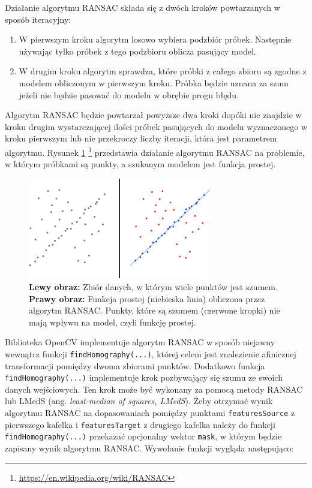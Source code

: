 Działanie algorytmu RANSAC składa się z dwóch kroków powtarzanych w sposób iteracyjny:

\begin{enumerate}
\item W pierwszym kroku algorytm losowo wybiera podzbiór próbek. Następnie używając tylko próbek z tego podzbioru oblicza pasujący model.
\item W drugim kroku algorytm sprawdza, które próbki z całego zbioru są zgodne z modelem obliczonym w pierwszym kroku. Próbka będzie uznana za szum jeżeli nie będzie pasować do modelu w obrębie progu błędu.
\end{enumerate}

Algorytm RANSAC będzie powtarzał powyższe dwa kroki dopóki nie znajdzie w kroku drugim wystarczającej ilości próbek pasujących do modelu wyznaczonego w kroku pierwszym lub nie przekroczy liczby iteracji, która jest parametrem algorytmu. Rysunek \ref{fig:proponowane_algorytmy:ransac} \footnote{\url{https://en.wikipedia.org/wiki/RANSAC}} przedstawia działanie algorytmu RANSAC na problemie, w którym próbkami są punkty, a szukanym modelem jest funkcja prostej.

\begin{figure}[htb]
  \centering
  \includegraphics[width=8cm]{gfx/ransac}
  \caption{\textbf{Lewy obraz:} Zbiór danych, w którym wiele punktów jest szumem. \textbf{Prawy obraz:} Funkcja prostej (niebieska linia) obliczona przez algorytm RANSAC. Punkty, które są szumem (czerwone kropki) nie mają wpływu na model, czyli funkcję prostej.}
  \label{fig:proponowane_algorytmy:ransac}
\end{figure}

Biblioteka OpenCV implementuje algorytm RANSAC w sposób niejawny wewnątrz funkcji \texttt{findHomography(...)}, której celem jest znalezienie afinicznej transformacji pomiędzy dwoma zbiorami punktów. Dodatkowo funkcja \texttt{findHomography(...)} implementuje krok pozbywający się szumu ze swoich danych wejściowych. Ten krok może być wykonany za pomocą metody RANSAC lub LMedS (ang. \textit{least-median of squares, LMedS}). Żeby otrzymać wynik algorytmu RANSAC na dopasowaniach pomiędzy punktami \texttt{featuresSource} z pierwszego kafelka i \texttt{featuresTarget} z drugiego kafelka należy do funkcji \texttt{findHomography(...)} przekazać opcjonalny wektor \texttt{mask}, w którym będzie zapisany wynik algorytmu RANSAC. Wywołanie funkcji wygląda następująco:

